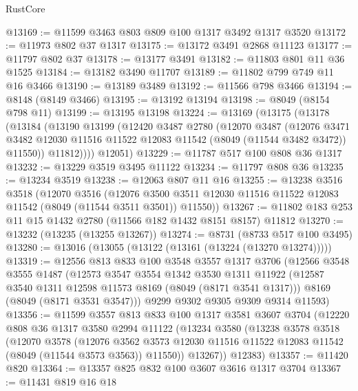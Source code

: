 \begin{lexlean}{RustCore}
\begin{coremodule}
@13169 := @11599 @3463 @803 @809 @100 @1317 @3492 @1317 @3520
@13172 := @11973 @802 @37 @1317
@13175 := @13172 @3491 @2868 @11123
@13177 := @11797 @802 @37
@13178 := @13177 @3491
@13182 := @11803 @801 @11 @36 @1525
@13184 := @13182 @3490 @11707
@13189 := @11802 @799 @749 @11 @16 @3466
@13190 := @13189 @3489
@13192 := @11566 @798 @3466
@13194 := @8148 (@8149 @3466)
@13195 := @13192 @13194
@13198 := @8049 (@8154 @798 @11)
@13199 := @13195 @13198
@13224 := @13169
    (@13175
      (@13178
        (@13184
          (@13190
            @13199
            (@12420
              @3487
              @2780
              (@12070
                @3487
                (@12076
                  @3471
                  @3482
                  @12030
                  @11516
                  @11522
                  @12083
                  @11542
                  (@8049 (@11544 @3482 @3472))
                  @11550))
              @11812))))
      @12051)
@13229 := @11787 @517 @100 @808 @36 @1317
@13232 := @13229 @3519 @3495 @11122
@13234 := @11797 @808 @36
@13235 := @13234 @3519
@13238 := @12063 @807 @11 @16
@13255 := @13238
    @3516
    @3518
    (@12070
      @3516
      (@12076 @3500 @3511 @12030 @11516 @11522 @12083 @11542 (@8049 (@11544 @3511 @3501)) @11550))
@13267 := @11802 @183 @253 @11 @15 @1432 @2780 (@11566 @182 @1432 @8151 @8157) @11812
@13270 := @13232 (@13235 (@13255 @13267))
@13274 := @8731 (@8733 @517 @100 @3495)
@13280 := @13016 (@13055 (@13122 (@13161 (@13224 (@13270 @13274)))))
@13319 := @12556
    @813
    @833
    @100
    @3548
    @3557
    @1317
    @3706
    (@12566
      @3548
      @3555
      @1487
      (@12573
        @3547
        @3554
        @1342
        @3530
        @1311
        @11922
        (@12587 @3540 @1311 @12598 @11573 @8169 (@8049 (@8171 @3541 @1317)))
        @8169
        (@8049 (@8171 @3531 @3547)))
      @9299
      @9302
      @9305
      @9309
      @9314
      @11593)
@13356 := @11599
    @3557
    @813
    @833
    @100
    @1317
    @3581
    @3607
    @3704
    (@12220
      @808
      @36
      @1317
      @3580
      @2994
      @11122
      (@13234
        @3580
        (@13238
          @3578
          @3518
          (@12070
            @3578
            (@12076
              @3562
              @3573
              @12030
              @11516
              @11522
              @12083
              @11542
              (@8049 (@11544 @3573 @3563))
              @11550))
          @13267))
      @12383)
@13357 := @11420 @820
@13364 := @13357 @825 @832 @100 @3607 @3616 @1317 @3704
@13367 := @11431 @819 @16 @18

\end{coremodule}
\end{lexlean}

